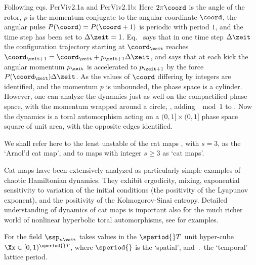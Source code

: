 \begin{description}
{Following eqs. {PerViv2.1a} and {PerViv2.1b}:
Here $2\pi \coord$ is the  angle of the rotor, $p$ is the
momentum conjugate to the angular coordinate $\coord$, the angular pulse
$P(\coord)=P(\coord+1)$ is periodic with period $1$, and the time step
has been set to $\Delta\zeit= 1$.
Eq.~ says that in one time step $\Delta\zeit$ the
configuration trajectory starting at $\coord_{\zeit}$ reaches
$\coord_{\zeit+1} = \coord_{\zeit}+p_{\zeit+1}\Delta {\zeit}$,
and
 says that at each kick the angular momentum
$p_{\zeit}$ is accelerated to $p_{\zeit+1}$ by the force
$P(\coord_{\zeit})\Delta\zeit$.
As the values of $\coord$ differing by integers are identified, and the
momentum $p$ is unbounded, the phase space is a cylinder. However, one
can analyze the dynamics just as well on the compactified phase space,
with the momentum wrapped around a circle, \ie, adding $\mod 1$ to
. Now the dynamics is a toral automorphism acting on a
$(0,1]\times(0,1]$ phase space square of unit area, with the opposite
edges identified.

We shall refer here to the least unstable of the cat maps
, with $s=3$, as the `Arnol'd cat
map', and to maps with integer $s\geq 3$ as `cat
maps'.

Cat maps have been extensively analyzed as particularly simple examples
of chaotic Hamiltonian dynamics. They  exhibit ergodicity, mixing,
exponential sensitivity to variation of the initial  conditions (the
positivity of the Lyapunov exponent), and  the
positivity of  the  Kolmogorov-Sinai  entropy.
Detailed understanding of dynamics of cat maps is important also for the
much richer world of nonlinear hyperbolic toral automorphisms, see
 for examples.

For {\catlatt}  the field $\ssp_{n\zeit}$ takes values in
the $\speriod{}\period{}$\dmn\ unit hyper-cube
$\Xx\in[0,1)^{\speriod{}\period{}}$, where $\speriod{}$ is the `spatial',
and $\period{}$ the `temporal' lattice period.

    }


\end{description}
